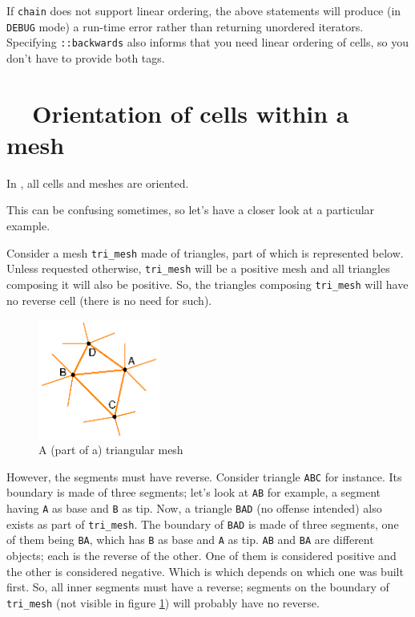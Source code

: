 If {\small\tt chain} does not support linear ordering, the above statements will produce
(in {\small\tt DEBUG} mode) a run-time error rather than returning unordered iterators.
Specifying {\small\tt{}::backwards} also informs {\maniFEM} that you need
linear ordering of cells, so you don't have to provide both tags.

\section{~~Orientation of cells within a mesh}\label{\numb section 9.\numb parag 7}

In \maniFEM, all cells and meshes are oriented.

This can be confusing sometimes, so let's have a closer look at a particular example.

Consider a mesh {\small\tt tri\_mesh} made of triangles, part of which is represented below.
Unless requested otherwise, {\small\tt tri\_mesh} will be a positive mesh and all triangles
composing it will also be positive.
So, the triangles composing {\small\tt tri\_mesh} will have no reverse cell
(there is no need for such).

\begin{figure}[ht] \centering
  \includegraphics[width=40mm]{malha-tri}
  \caption{A (part of a) triangular mesh}
  \label{\numb section 9.\numb fig 2}
\end{figure}

However, the segments must have reverse.
Consider triangle {\small\tt ABC} for instance.
Its boundary is made of three segments; let's look at {\small\tt AB} for example,
a segment having {\small\tt A} as base and {\small\tt B} as tip.
Now, a triangle {\small\tt BAD} (no offense intended) also exists as part of
{\small\tt tri\_mesh}.
The boundary of {\small\tt BAD} is made of three segments, one of them being {\small\tt BA},
which has {\small\tt B} as base and {\small\tt A} as tip.
{\small\tt AB} and {\small\tt BA} are different {\small\tt {}} objects;
each is the reverse of the other.
One of them is considered positive and the other is considered negative.
Which is which depends on which one was built first.
So, all inner segments must have a reverse;
segments on the boundary of {\small\tt tri\_mesh} (not visible in figure
\ref{\numb section 9.\numb fig 2}) will probably have no reverse.

